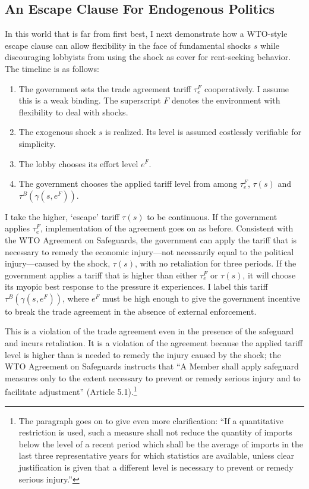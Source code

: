 \documentclass[12pt,titlepage]{article}
\newcommand{\ga}{\gamma}
\begin{document}
\subsection{An Escape Clause For Endogenous Politics}
\label{sec:ECendog}
In this world that is far from first best, I next demonstrate how a WTO-style escape clause can allow flexibility in the face of fundamental shocks $s$ while discouraging lobbyists from using the shock as cover for rent-seeking behavior. The timeline is as follows:
\begin{enumerate}
	\item The government sets the trade agreement tariff $\tau_e^F$ cooperatively. I assume this is a weak binding. The superscript $F$ denotes the environment with flexibility to deal with shocks.
	\item The exogenous shock $s$ is realized. Its level is assumed costlessly verifiable for simplicity.
	\item The lobby chooses its effort level $e^F$.
	\item The government chooses the applied tariff level from among $\tau_e^F$, $\tau(s)$ and $\tau^B(\ga(s,e^F))$.
\end{enumerate}
I take the higher, `escape' tariff $\tau(s)$ to be continuous. If the government applies $\tau_e^F$, implementation of the agreement goes on as before. Consistent with the WTO Agreement on Safeguards, the government can apply the tariff that is necessary to remedy the economic injury---not necessarily equal to the political injury---caused by the shock, $\tau(s)$, with no retaliation for three periods. If the government applies a tariff that is higher than either $\tau_e^F$ or $\tau(s)$, it will choose its myopic best response to the pressure it experiences. I label this tariff $\tau^B(\ga(s,e^F))$, where $e^F$ must be high enough to give the government incentive to break the trade agreement in the absence of external enforcement.

This is a violation of the trade agreement even in the presence of the safeguard and incurs retaliation. It is a violation of the agreement because the applied tariff level is higher than is needed to remedy the injury caused by the shock; the WTO Agreement on Safeguards instructs that ``A Member shall apply safeguard measures only to the extent necessary to prevent or remedy serious injury and to facilitate adjustment'' (Article 5.1).\footnote{The paragraph goes on to give even more clarification: ``If a quantitative restriction is used, such a measure shall  not reduce the quantity of imports below the level of a recent period which shall be the average of imports in the last three representative years for which statistics are available, unless clear justification is given that a different level is necessary to prevent or remedy serious injury.''}
\end{document}
